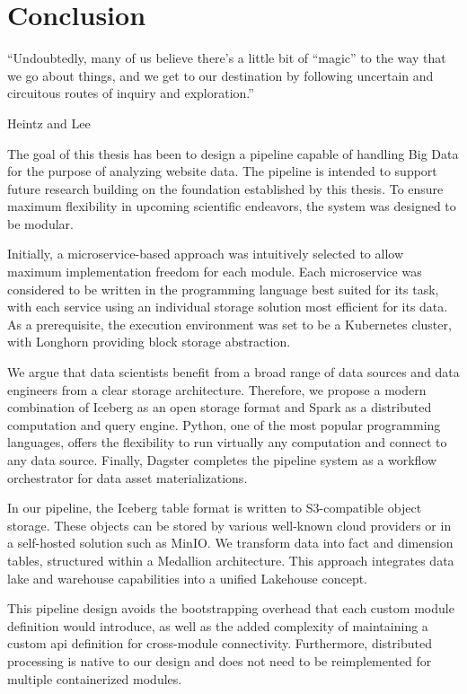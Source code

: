 \section{Conclusion}
\label{sec:conclusion}

\epigraph{
    ``Undoubtedly, many of us believe there's a little bit of “magic” to the way that we go about things, and we get to our destination by following uncertain and circuitous routes of inquiry and exploration.''
}{
    Heintz and Lee~\cite{Heintz2019}
}

The goal of this thesis has been to design a pipeline capable of handling Big Data for the purpose of analyzing website data.
The pipeline is intended to support future research building on the foundation established by this thesis.
To ensure maximum flexibility in upcoming scientific endeavors, the system was designed to be modular.

Initially, a microservice-based approach was intuitively selected to allow maximum implementation freedom for each module.
Each microservice was considered to be written in the programming language best suited for its task, with each service using an individual storage solution most efficient for its data.
As a prerequisite, the execution environment was set to be a Kubernetes cluster, with Longhorn providing block storage abstraction.

We argue that data scientists benefit from a broad range of data sources and data engineers from a clear storage architecture.
Therefore, we propose a modern combination of Iceberg as an open storage format and Spark as a distributed computation and query engine.
Python, one of the most popular programming languages, offers the flexibility to run virtually any computation and connect to any data source.
Finally, Dagster completes the pipeline system as a workflow orchestrator for data asset materializations.

In our pipeline, the Iceberg table format is written to S3-compatible object storage.
These objects can be stored by various well-known cloud providers or in a self-hosted solution such as MinIO.
We transform data into fact and dimension tables, structured within a Medallion architecture.
This approach integrates data lake and warehouse capabilities into a unified Lakehouse concept.

This pipeline design avoids the bootstrapping overhead that each custom module definition would introduce, as well as the added complexity of maintaining a custom \ac{api} definition for cross-module connectivity.
Furthermore, distributed processing is native to our design and does not need to be reimplemented for multiple containerized modules.

